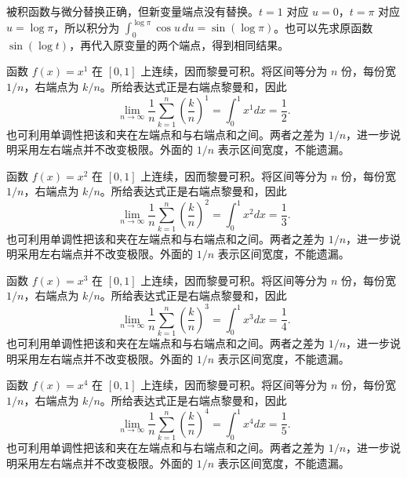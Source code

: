 \documentclass[12pt,fontset=fandol]{ctexart}
\begin{document}
\begin{solve}\label{ans:c17q2}
被积函数与微分替换正确，但新变量端点没有替换。$t=1$ 对应 $u=0$，$t=\pi$ 对应 $u=\log\pi$，所以积分为 $\int_0^{\log\pi}\cos u\,du=\sin(\log\pi)$。也可以先求原函数 $\sin(\log t)$，再代入原变量的两个端点，得到相同结果。
\end{solve}

\begin{solve}\label{ans:c17q3}
函数 $f(x)=x^{1}$ 在 $[0,1]$ 上连续，因而黎曼可积。将区间等分为 $n$ 份，每份宽 $1/n$，右端点为 $k/n$。所给表达式正是右端点黎曼和，因此
\[
\lim_{n\to\infty}\frac1n\sum_{k=1}^n\left(\frac kn\right)^{1}=\int_0^1x^{1}dx=\frac{1}{2}.
\]
也可利用单调性把该和夹在左端点和与右端点和之间。两者之差为 $1/n$，进一步说明采用左右端点并不改变极限。外面的 $1/n$ 表示区间宽度，不能遗漏。
\end{solve}

\begin{solve}\label{ans:c17q4}
函数 $f(x)=x^{2}$ 在 $[0,1]$ 上连续，因而黎曼可积。将区间等分为 $n$ 份，每份宽 $1/n$，右端点为 $k/n$。所给表达式正是右端点黎曼和，因此
\[
\lim_{n\to\infty}\frac1n\sum_{k=1}^n\left(\frac kn\right)^{2}=\int_0^1x^{2}dx=\frac{1}{3}.
\]
也可利用单调性把该和夹在左端点和与右端点和之间。两者之差为 $1/n$，进一步说明采用左右端点并不改变极限。外面的 $1/n$ 表示区间宽度，不能遗漏。
\end{solve}

\begin{solve}\label{ans:c17q5}
函数 $f(x)=x^{3}$ 在 $[0,1]$ 上连续，因而黎曼可积。将区间等分为 $n$ 份，每份宽 $1/n$，右端点为 $k/n$。所给表达式正是右端点黎曼和，因此
\[
\lim_{n\to\infty}\frac1n\sum_{k=1}^n\left(\frac kn\right)^{3}=\int_0^1x^{3}dx=\frac{1}{4}.
\]
也可利用单调性把该和夹在左端点和与右端点和之间。两者之差为 $1/n$，进一步说明采用左右端点并不改变极限。外面的 $1/n$ 表示区间宽度，不能遗漏。
\end{solve}

\begin{solve}\label{ans:c17q6}
函数 $f(x)=x^{4}$ 在 $[0,1]$ 上连续，因而黎曼可积。将区间等分为 $n$ 份，每份宽 $1/n$，右端点为 $k/n$。所给表达式正是右端点黎曼和，因此
\[
\lim_{n\to\infty}\frac1n\sum_{k=1}^n\left(\frac kn\right)^{4}=\int_0^1x^{4}dx=\frac{1}{5}.
\]
也可利用单调性把该和夹在左端点和与右端点和之间。两者之差为 $1/n$，进一步说明采用左右端点并不改变极限。外面的 $1/n$ 表示区间宽度，不能遗漏。
\end{solve}
\end{document}

